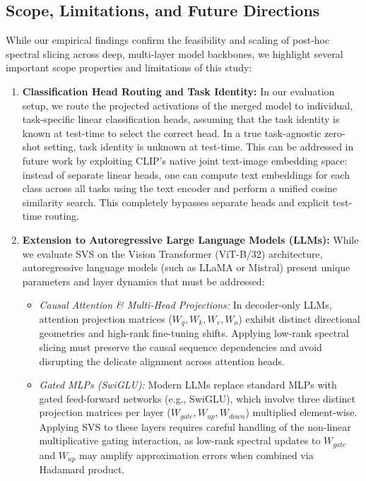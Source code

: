 \subsection{Scope, Limitations, and Future Directions}
\label{sec:limitations}

While our empirical findings confirm the feasibility and scaling of post-hoc spectral slicing across deep, multi-layer model backbones, we highlight several important scope properties and limitations of this study:
\begin{enumerate}
    \item \textbf{Classification Head Routing and Task Identity:} In our evaluation setup, we route the projected activations of the merged model to individual, task-specific linear classification heads, assuming that the task identity is known at test-time to select the correct head. In a true task-agnostic zero-shot setting, task identity is unknown at test-time. This can be addressed in future work by exploiting CLIP's native joint text-image embedding space: instead of separate linear heads, one can compute text embeddings for each class across all tasks using the text encoder and perform a unified cosine similarity search. This completely bypasses separate heads and explicit test-time routing.
    \item \textbf{Extension to Autoregressive Large Language Models (LLMs):} While we evaluate SVS on the Vision Transformer (ViT-B/32) architecture, autoregressive language models (such as LLaMA or Mistral) present unique parameters and layer dynamics that must be addressed:
    \begin{itemize}
        \item \emph{Causal Attention \& Multi-Head Projections:} In decoder-only LLMs, attention projection matrices ($W_q, W_k, W_v, W_o$) exhibit distinct directional geometries and high-rank fine-tuning shifts. Applying low-rank spectral slicing must preserve the causal sequence dependencies and avoid disrupting the delicate alignment across attention heads.
        \item \emph{Gated MLPs (SwiGLU):} Modern LLMs replace standard MLPs with gated feed-forward networks (e.g., SwiGLU), which involve three distinct projection matrices per layer ($W_{gate}, W_{up}, W_{down}$) multiplied element-wise. Applying SVS to these layers requires careful handling of the non-linear multiplicative gating interaction, as low-rank spectral updates to $W_{gate}$ and $W_{up}$ may amplify approximation errors when combined via Hadamard product.
    \end{itemize}

\end{enumerate}

